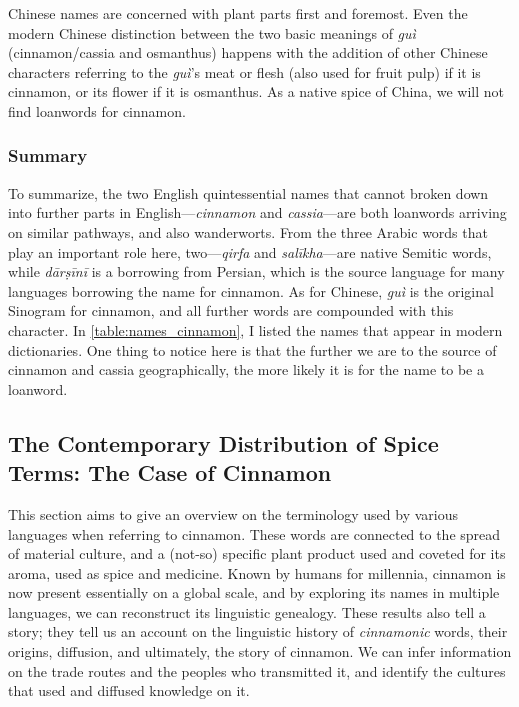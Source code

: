 
Chinese names are concerned with plant parts first and foremost. Even the modern Chinese distinction between the two basic meanings of \textit{guì} (cinnamon/cassia and osmanthus) happens with the addition of other Chinese characters referring to the \textit{guì}'s meat or flesh (also used for fruit pulp) if it is cinnamon, or its flower if it is osmanthus. As a native spice of China, we will not find loanwords for cinnamon.



\subsubsection{Summary}



To summarize, the two English quintessential names that cannot broken down into further parts in English---\textit{cinnamon} and \textit{cassia}---are both loanwords arriving on similar pathways, and also \glspl{wanderwort}. From the three Arabic words that play an important role here, two---\textit{qirfa} and \textit{salīkha}---are native Semitic words, while \textit{dārṣīnī} is a borrowing from Persian, which is the source language for many languages borrowing the name for cinnamon. As for Chinese, \textit{guì} is the original Sinogram for cinnamon, and all further words are compounded with this character. In \cref{table:names_cinnamon}, I listed the names that appear in modern dictionaries. One thing to notice here is that the further we are to the source of cinnamon and cassia geographically, the more likely it is for the name to be a loanword.




\subsection{The Contemporary Distribution of Spice Terms: The Case of Cinnamon}
\label{sec:case_of_cinnamon}


This section aims to give an overview on the terminology used by various languages when referring to cinnamon. These words are connected to the spread of material culture, and a (not-so) specific plant product used and coveted for its aroma, used as spice and medicine. Known by humans for millennia, cinnamon is now present essentially on a global scale, and by exploring its names in multiple languages, we can reconstruct its linguistic genealogy. These results also tell a story; they tell us an account on the linguistic history of \emph{cinnamonic} words, their origins, diffusion, and ultimately, the story of cinnamon. We can infer information on the trade routes and the peoples who transmitted it, and identify the cultures that used and diffused knowledge on it. 


